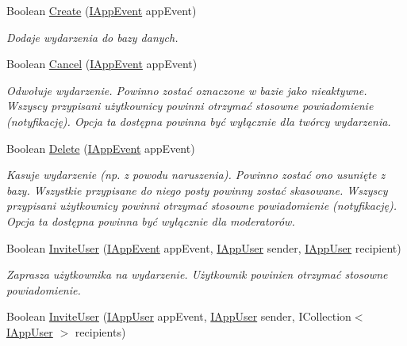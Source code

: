 \begin{DoxyCompactItemize}
\item 
Boolean \hyperlink{interface_contract_1_1_i_app_event_service_a6dc064133c574d73bbd0246c408948c2}{Create} (\hyperlink{interface_contract_1_1_i_app_event}{I\+App\+Event} app\+Event)
\begin{DoxyCompactList}\small\item\em Dodaje wydarzenia do bazy danych. \end{DoxyCompactList}\item 
Boolean \hyperlink{interface_contract_1_1_i_app_event_service_ace6a7e896bc3c461dcd0f455eb315d00}{Cancel} (\hyperlink{interface_contract_1_1_i_app_event}{I\+App\+Event} app\+Event)
\begin{DoxyCompactList}\small\item\em Odwołuje wydarzenie. Powinno zostać oznaczone w bazie jako nieaktywne. Wszyscy przypisani użytkownicy powinni otrzymać stosowne powiadomienie (notyfikację). Opcja ta dostępna powinna być wyłącznie dla twórcy wydarzenia. \end{DoxyCompactList}\item 
Boolean \hyperlink{interface_contract_1_1_i_app_event_service_adafb6d6697e7968571bb42a13a9cbc41}{Delete} (\hyperlink{interface_contract_1_1_i_app_event}{I\+App\+Event} app\+Event)
\begin{DoxyCompactList}\small\item\em Kasuje wydarzenie (np. z powodu naruszenia). Powinno zostać ono usunięte z bazy. Wszystkie przypisane do niego posty powinny zostać skasowane. Wszyscy przypisani użytkownicy powinni otrzymać stosowne powiadomienie (notyfikację). Opcja ta dostępna powinna być wyłącznie dla moderatorów. \end{DoxyCompactList}\item 
Boolean \hyperlink{interface_contract_1_1_i_app_event_service_a4ae422cd32e1abfbaca20593aedbd3a8}{Invite\+User} (\hyperlink{interface_contract_1_1_i_app_event}{I\+App\+Event} app\+Event, \hyperlink{interface_contract_1_1_i_app_user}{I\+App\+User} sender, \hyperlink{interface_contract_1_1_i_app_user}{I\+App\+User} recipient)
\begin{DoxyCompactList}\small\item\em Zaprasza użytkownika na wydarzenie. Użytkownik powinien otrzymać stosowne powiadomienie. \end{DoxyCompactList}\item 
Boolean \hyperlink{interface_contract_1_1_i_app_event_service_aa4911fab308fd95363a320e66f966008}{Invite\+User} (\hyperlink{interface_contract_1_1_i_app_user}{I\+App\+User} app\+Event, \hyperlink{interface_contract_1_1_i_app_user}{I\+App\+User} sender, I\+Collection$<$ \hyperlink{interface_contract_1_1_i_app_user}{I\+App\+User} $>$ recipients)

\end{DoxyCompactItemize}
